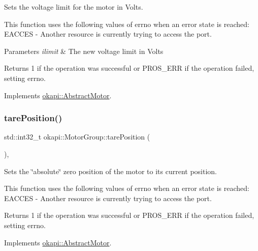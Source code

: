 Sets the voltage limit for the motor in Volts.

This function uses the following values of errno when an error state is reached\+: E\+A\+C\+C\+ES -\/ Another resource is currently trying to access the port.


\begin{DoxyParams}{Parameters}
{\em ilimit} & The new voltage limit in Volts \\
\hline
\end{DoxyParams}
\begin{DoxyReturn}{Returns}
1 if the operation was successful or {\ttfamily P\+R\+O\+S\+\_\+\+E\+RR} if the operation failed, setting errno. 
\end{DoxyReturn}


Implements \mbox{\hyperlink{classokapi_1_1AbstractMotor_a2f33faf946b99cd34e9a591ccc33d644}{okapi\+::\+Abstract\+Motor}}.

\mbox{\label{classokapi_1_1MotorGroup_a59aef8ea3c212e3466b67631978e47eb}} 
\subsubsection{\texorpdfstring{tarePosition()}{tarePosition()}}
{\footnotesize\ttfamily std\+::int32\+\_\+t okapi\+::\+Motor\+Group\+::tare\+Position (\begin{DoxyParamCaption}{ }\end{DoxyParamCaption})\hspace{0.3cm}{\ttfamily [override]}, {\ttfamily [virtual]}}

Sets the \char`\"{}absolute\char`\"{} zero position of the motor to its current position.

This function uses the following values of errno when an error state is reached\+: E\+A\+C\+C\+ES -\/ Another resource is currently trying to access the port.

\begin{DoxyReturn}{Returns}
1 if the operation was successful or {\ttfamily P\+R\+O\+S\+\_\+\+E\+RR} if the operation failed, setting errno. 
\end{DoxyReturn}


Implements \mbox{\hyperlink{classokapi_1_1AbstractMotor_ac36edbc92db85a11adcfee56275de15b}{okapi\+::\+Abstract\+Motor}}.



